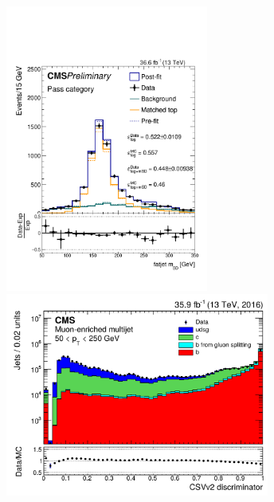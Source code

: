 \documentclass[aspectratio=169,xcolor=dvipsnames,,table,compress]{beamer}
\begin{document}
\begin{frame}[t]
\begin{columns}[T]
\begin{column}{0.5\textwidth}
      \includegraphics[width=0.5\textwidth]{../figures/toptagging/sf/tight_pass.pdf}
      \includegraphics[width=0.65\textwidth]{../figures/cms/csvv2.png}
  \end{column}
  \end{columns}
\end{frame}
\end{document}
